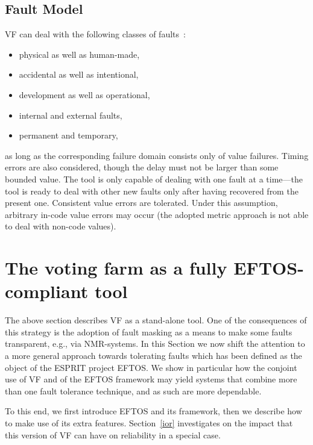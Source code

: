 \documentclass[11pt]{article}
\begin{document}
\subsection{Fault Model}\label{fm}
VF can deal with the following classes of faults~\cite{Lapr95}:
\begin{itemize}
\item physical as well as human-made,
\item accidental as well as intentional,
\item development as well as operational,
\item internal and external faults,
\item permanent and temporary,
\end{itemize}

\noindent
as long as the corresponding failure domain consists only of value failures. 
Timing errors are also considered, though the delay must not be larger than some bounded value.
The tool is only capable of dealing with one fault at a time---the tool is ready to deal 
with other new faults only after having recovered from the present one.
Consistent value errors are tolerated.
Under this assumption, arbitrary in-code value errors
may occur (the adopted metric approach is not able to deal with non-code values).







\section{The voting farm as a fully EFTOS-compliant tool}\label{plugged}
The above section describes VF as a stand-alone tool. One of the consequences
of this strategy is the adoption of fault masking as a means to make
some faults transparent, e.g., via NMR{}-systems. In this Section we
now shift the attention to a more general approach towards tolerating
faults which has been defined as the object of the ESPRIT project EFTOS.
We show in particular how the conjoint use of VF and of the EFTOS framework
may yield systems that combine more than one fault tolerance technique, and
as such are more dependable.

To this end, we first introduce EFTOS and its framework, then we
describe how to make use of its extra features. Section~\ref{ior}
investigates on the impact that this version of VF can have
on reliability in a special case.
\end{document}
